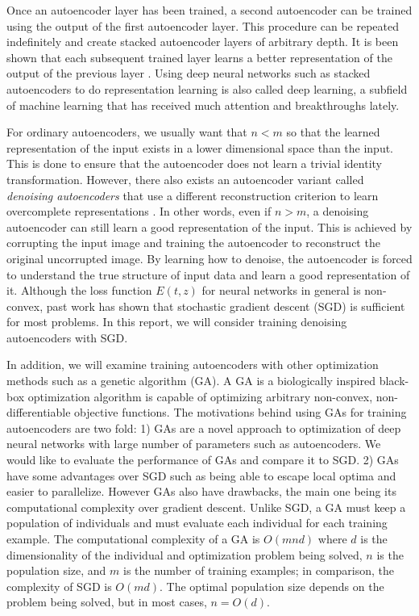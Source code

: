 Once an autoencoder layer has been trained, a second autoencoder can be trained using the output of the first autoencoder layer. This procedure can be repeated indefinitely and create stacked autoencoder layers of arbitrary depth. It is been shown that each subsequent trained layer learns a better representation of the output of the previous layer \cite{vincent2010stacked}. Using deep neural networks such as stacked autoencoders to do representation learning is also called deep learning, a subfield of machine learning that has received much attention and breakthroughs lately. 

For ordinary autoencoders, we usually want that $n<m$ so that the learned representation of the input exists in a lower dimensional space than the input. This is done to ensure that the autoencoder does not learn a trivial identity transformation. However, there also exists an autoencoder variant called \textit{denoising autoencoders} that use a different reconstruction criterion to learn overcomplete representations \cite{vincent2010stacked}. In other words, even if $n>m$, a denoising autoencoder can still learn a good representation of the input. This is achieved by corrupting the input image and training the autoencoder to reconstruct the original uncorrupted image. By learning how to denoise, the autoencoder is forced to understand the true structure of input data and learn a good representation of it. Although the loss function $E(t,z)$ for neural networks in general is non-convex, past work has shown that stochastic gradient descent (SGD) is sufficient for most problems. In this report, we will consider training denoising autoencoders with SGD. 

In addition, we will examine training autoencoders with other optimization methods such as a genetic algorithm (GA). A GA is a biologically inspired black-box optimization algorithm is capable of optimizing arbitrary non-convex, non-differentiable objective functions. The motivations behind using GAs for training autoencoders are two fold: 1) GAs are a novel approach to optimization of deep neural networks with large number of parameters such as autoencoders. We would like to evaluate the performance of GAs and compare it to SGD. 2) GAs have some advantages over SGD such as being able to escape local optima and easier to parallelize. However GAs also have drawbacks, the main one being its computational complexity over gradient descent. Unlike SGD, a GA must keep a population of individuals and must evaluate each individual for each training example. The computational complexity of a GA is $O(mnd)$ where $d$ is the dimensionality of the individual and optimization problem being solved, $n$ is the population size, and $m$ is the number of training examples; in comparison, the complexity of SGD is $O(md)$. The optimal population size depends on the problem being solved, but in most cases, $n=O(d)$. 

